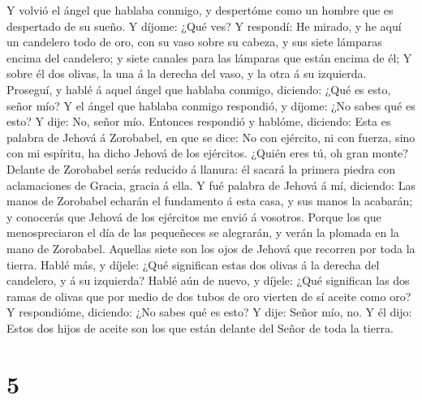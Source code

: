  Y volvió el ángel que hablaba conmigo, y despertóme como un
hombre que es despertado de su sueño.  Y díjome: ¿Qué ves? Y
respondí: He mirado, y he aquí un candelero todo de oro, con su vaso
sobre su cabeza, y sus siete lámparas encima del candelero; y siete
canales para las lámparas que están encima de él;  Y sobre
él dos olivas, la una á la derecha del vaso, y la otra á su izquierda.
 Proseguí, y hablé á aquel ángel que hablaba conmigo,
diciendo: ¿Qué es esto, señor mío?  Y el ángel que hablaba
conmigo respondió, y díjome: ¿No sabes qué es esto? Y dije: No, señor
mío.  Entonces respondió y hablóme, diciendo: Esta es
palabra de Jehová á Zorobabel, en que se dice: No con ejército, ni con
fuerza, sino con mi espíritu, ha dicho Jehová de los ejércitos.
 ¿Quién eres tú, oh gran monte? Delante de Zorobabel serás
reducido á llanura: él sacará la primera piedra con aclamaciones de
Gracia, gracia á ella.  Y fué palabra de Jehová á mí,
diciendo:  Las manos de Zorobabel echarán el fundamento á
esta casa, y sus manos la acabarán; y conocerás que Jehová de los
ejércitos me envió á vosotros.  Porque los que
menospreciaron el día de las pequeñeces se alegrarán, y verán la plomada
en la mano de Zorobabel. Aquellas siete son los ojos de Jehová que
recorren por toda la tierra.  Hablé más, y díjele: ¿Qué
significan estas dos olivas á la derecha del candelero, y á su
izquierda?  Hablé aún de nuevo, y díjele: ¿Qué significan
las dos ramas de olivas que por medio de dos tubos de oro vierten de sí
aceite como oro?  Y respondióme, diciendo: ¿No sabes qué es
esto? Y dije: Señor mío, no.  Y él dijo: Estos dos hijos de
aceite son los que están delante del Señor de toda la tierra.

\hypertarget{section-4}{%
\section{5}\label{section-4}}

